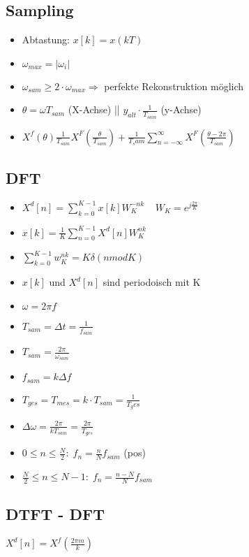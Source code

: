 \documentclass{article}
\begin{document}
\subsection{Sampling}
\begin{itemize}
\item Abtastung: $x[k] = x(kT)$
\item $\omega_{max} = |\omega_i|$
\item $\omega_{sam} \geq 2\cdot \omega_{max} \Rightarrow$ perfekte Rekonstruktion möglich
\item $\theta = \omega T_{sam}$ (X-Achse) ||  $y_{alt}\cdot \frac{1}{T_{sam}}$ (y-Achse)
\item $X^f(\theta) \frac{1}{T_{sam}} X^F(\frac{\theta}{T_{sam}}) + \frac{1}{T_sam} \sum_{n=-\infty}^\infty X^F(\frac{\theta-2\pi}{T_{sam}})$
\end{itemize}

\subsection{DFT}
\begin{itemize}
\item $X^d[n] = \sum_{k=0}^{K-1}x[k]W_K^{-nk} \; \; \; \; W_K=e^{j\frac{2\pi}{K}}$
\item $x[k] = \frac{1}{K} \sum_{n= 0}^{K-1} X^d[n]W_K^{nk}$
\item $\sum_{k=0}^{K-1} w_K^{nk} = K\delta(n mod K)$
\item $x[k]$ und $X^d[n]$ sind periodoisch mit K
\end{itemize}

\begin{itemize}
\item $\omega = 2\pi f $
\item $T_{sam} = \Delta t = \frac{1}{f_{sam}}$
\item $T_{sam}=\frac{2\pi}{\omega_{sam}}$
\item $f_{sam} = k \Delta f$
\item $T_{ges} = T_{mes} = k\cdot T_{sam} = \frac{1}{T_ges}$
\item $\Delta \omega = \frac{2\pi}{k T_{sam}} = \frac{2\pi}{T_{ges}}$
\item $0 \leq n \leq \frac{N}{2}: \; f_n = \frac{n}{N} f_{sam}$ (pos)
\item $\frac{N}{2} \leq n \leq N-1:\; f_n= \frac{n-N}{N} f_{sam} $
\end{itemize}

\subsection{DTFT - DFT}
$X^d[n]= X^f(\frac{2\pi m}{k})$
\end{document}

